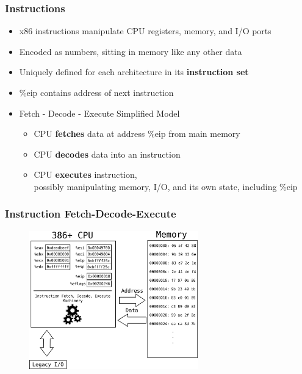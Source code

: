 \documentclass[11pt,xcolor=dvipsnames]{beamer}
\newcommand{\vs}{\vspace{0.5em}}
\newcommand{\mvs}{\vspace{-0.95em}}
\begin{document}
\begin{frame}[fragile,t]
\frametitle{Instructions}
\begin{itemize}
    \item x86 instructions manipulate CPU registers, memory, and I/O ports
    \item Encoded as numbers, sitting in memory like any other data
    \item Uniquely defined for each architecture in its {\bf instruction set}
    \item {\ttfamily \%eip} contains address of next instruction
    \vs \vs \vs
    \pause
    \item Fetch - Decode - Execute Simplified Model
    \begin{itemize}
        \item CPU {\bf fetches} data at address {\ttfamily \%eip} from main memory \\
        \item CPU {\bf decodes} data into an instruction \\
        \item CPU {\bf executes} instruction, \\ possibly manipulating memory, I/O, and its own state, including {\ttfamily \%eip}
    \end{itemize}
\end{itemize}
\end{frame}

\begin{frame}[fragile,t]
\frametitle{Instruction Fetch-Decode-Execute}
\mvs
\begin{figure}
\centering \includegraphics[width=0.65\textwidth]{figures/386fetch_decode_execute0.png}
\end{figure}
\end{frame}
\end{document}
